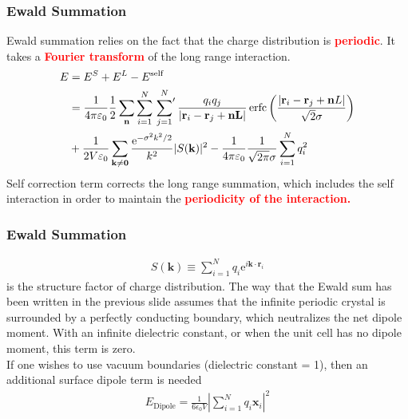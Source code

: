 \documentclass{beamer}
\newenvironment{noheadline}{
	\setbeamertemplate{headline}{}
	\addtobeamertemplate{frametitle}{\vspace*{-0.9\baselineskip}}{}
}{}
\newcommand{\bb}[1]{\textcolor{red}{\textbf{#1}}}
\begin{document}
\begin{noheadline}
\begin{frame}
\frametitle{Ewald Summation}
Ewald summation relies on the fact that the charge distribution is \bb{periodic}. It takes a \bb{Fourier transform} of the long range interaction.
\begin{align*} 
	E & =  E ^ { S } + E ^ { L } - E ^ { \mathrm { self } } \\ &=  \frac { 1 } { 4 \pi \varepsilon _ { 0 } } \frac { 1 } { 2 } \sum _ { \mathbf { n } } \sum _ { i = 1 } ^ { N } \sideset{}{'}\sum _ { j = 1 } ^ { N } \frac { q _ { i } q _ { j } } { \left| \mathbf { r } _ { i } - \mathbf { r } _ { j } + \mathbf { n L } \right| } \operatorname { erfc } \left( \frac { \left| \mathbf { r } _ { i } - \mathbf { r } _ { j } + \mathbf { n } L \right| } { \sqrt { 2 } \sigma } \right) \\ & + \frac { 1 } { 2 V \varepsilon _ { 0 } } \sum _ { \mathbf { k } \neq \mathbf { 0 } } \frac { \mathrm { e } ^ { - \sigma ^ { 2 } k ^ { 2 } / 2 } } { k ^ { 2 } } | S ( \mathbf { k } ) | ^ { 2 } - \frac { 1 } { 4 \pi \varepsilon _ { 0 } } \frac { 1 } { \sqrt { 2 \pi } \sigma } \sum _ { i = 1 } ^ { N } q _ { i } ^ { 2 } 
\end{align*}
Self correction term corrects the long range summation, which includes the self interaction in order to maintain the \bb{periodicity of the interaction.}
\end{frame}

\begin{frame}
\frametitle{Ewald Summation}
\begin{align*} 
S ( \mathbf { k } ) \equiv \sum _ { i = 1 } ^ { N } q _ { i } \mathrm { e } ^ { i \mathbf { k } \cdot \mathbf { r } _ { i } }
\end{align*}
is the structure factor of charge distribution. The way that the Ewald sum has been written in the previous slide assumes that the infinite periodic crystal is surrounded by a perfectly conducting boundary, which neutralizes the net dipole moment. With an infinite dielectric constant, or when the unit cell has no dipole moment, this term is zero.\\ 

If one wishes to use vacuum boundaries (dielectric constant = 1), then an additional surface dipole term is needed
\begin{align*}
E_{\text{Dipole}} = \frac { 1 } { 6 \epsilon _ { 0 } V } \left| \sum _ { i = 1 } ^ { N } q _ { i } \boldsymbol { x } _ { i } \right| ^ { 2 } 
\end{align*}
\end{frame}


\end{noheadline}
\end{document}
